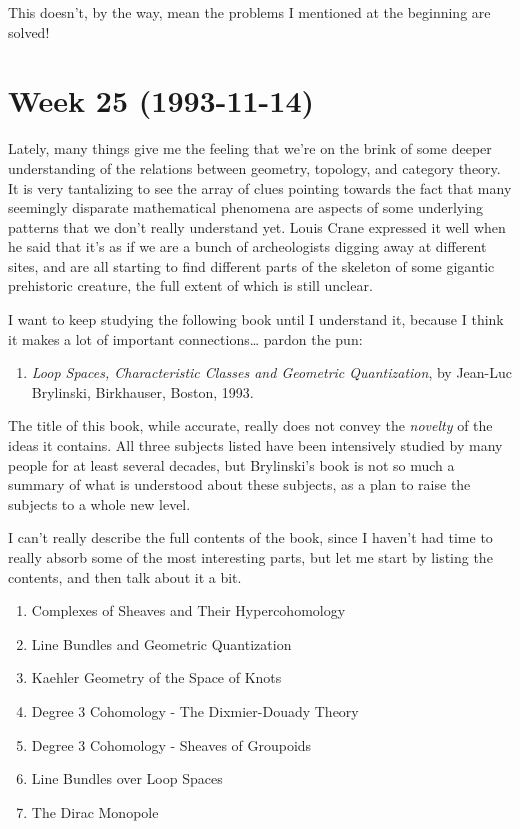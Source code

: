 \documentclass{article}
\def\tightlist{}
\begin{document}
This doesn't, by the way, mean the problems I mentioned at the beginning
are solved!
\hypertarget{week-25-1993-11-14}{%
\section{Week 25 (1993-11-14)}\label{week-25-1993-11-14}}

Lately, many things give me the feeling that we're on the brink of some
deeper understanding of the relations between geometry, topology, and
category theory. It is very tantalizing to see the array of clues
pointing towards the fact that many seemingly disparate mathematical
phenomena are aspects of some underlying patterns that we don't really
understand yet. Louis Crane expressed it well when he said that it's as
if we are a bunch of archeologists digging away at different sites, and
are all starting to find different parts of the skeleton of some
gigantic prehistoric creature, the full extent of which is still
unclear.

I want to keep studying the following book until I understand it,
because I think it makes a lot of important connections\ldots{} pardon
the pun:

\begin{enumerate}
\def\labelenumi{\arabic{enumi})}
\tightlist
\item
  \emph{Loop Spaces, Characteristic Classes and Geometric Quantization},
  by Jean-Luc Brylinski, Birkhauser, Boston, 1993.
\end{enumerate}

The title of this book, while accurate, really does not convey the
\emph{novelty} of the ideas it contains. All three subjects listed have
been intensively studied by many people for at least several decades,
but Brylinski's book is not so much a summary of what is understood
about these subjects, as a plan to raise the subjects to a whole new
level.

I can't really describe the full contents of the book, since I haven't
had time to really absorb some of the most interesting parts, but let me
start by listing the contents, and then talk about it a bit.

\begin{enumerate}
\def\labelenumi{\arabic{enumi}.}
\tightlist
\item
  Complexes of Sheaves and Their Hypercohomology
\item
  Line Bundles and Geometric Quantization
\item
  Kaehler Geometry of the Space of Knots
\item
  Degree 3 Cohomology - The Dixmier-Douady Theory
\item
  Degree 3 Cohomology - Sheaves of Groupoids
\item
  Line Bundles over Loop Spaces
\item
  The Dirac Monopole
\end{enumerate}
\end{document}
